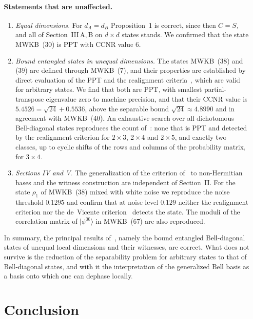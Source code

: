 \documentclass[11pt,a4paper]{article}
\theoremstyle{definition}
\theoremstyle{remark}
\newcommand{\ket}[1]{\lvert #1\rangle}
\newcommand{\dA}{d_A}
\newcommand{\dB}{d_B}
\newcommand{\phib}[2]{\phi^{#1#2}}
\begin{document}
\paragraph{Statements that are unaffected.}
\begin{enumerate}
\item \emph{Equal dimensions.} For $\dA=\dB$ Proposition~1 is correct, since then $C=S$,
and all of Section~III\,A,\,B on $d\times d$ states stands. We confirmed that the state
MWKB~(30) is PPT with CCNR value $6$.
\item \emph{Bound entangled states in unequal dimensions.} The states MWKB~(38) and (39)
are defined through MWKB~(7), and their properties are established by direct evaluation of
the PPT and the realignment criteria~\cite{CW03,Rudolph05}, which are valid for arbitrary
states. We find that both are PPT, with smallest partial-transpose eigenvalue zero to
machine precision, and that their CCNR value is $5.4526=\sqrt{24}+0.5536$, above the separable bound
$\sqrt{24}\approx4.8990$ and in agreement with MWKB~(40). An exhaustive search over all dichotomous Bell-diagonal states reproduces the
count of~\cite{MWKB24}: none that is PPT and detected by the realignment criterion for
$2\times3$, $2\times4$ and $2\times5$, and exactly two classes, up to cyclic shifts of the
rows and columns of the probability matrix, for $3\times4$.
\item \emph{Sections IV and V.} The generalization of the criterion of~\cite{SSC20} to
non-Hermitian bases and the witness construction are independent of Section~II. For the
state $\rho_1$ of MWKB~(38) mixed with white noise we reproduce the noise threshold
$0.1295$ and confirm that at noise level $0.129$ neither the realignment criterion nor
the de~Vicente criterion~\cite{deVicente07} detects the state. The moduli of the
correlation matrix of $\ket{\phib00}$ in MWKB~(67) are also reproduced.
\end{enumerate}

In summary, the principal results of~\cite{MWKB24}, namely the bound entangled
Bell-diagonal states of unequal local dimensions and their witnesses, are correct. What
does not survive is the reduction of the separability problem for arbitrary states to
that of Bell-diagonal states, and with it the interpretation of the generalized Bell
basis as a basis onto which one can dephase locally.

\section{Conclusion}
\end{document}

